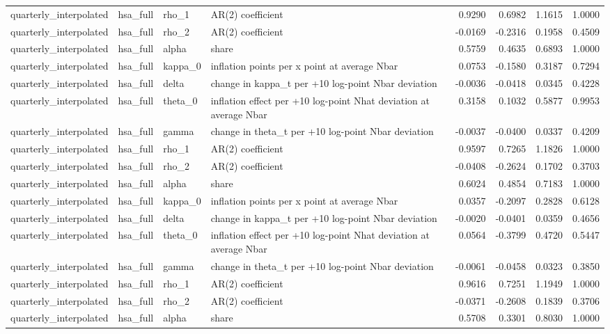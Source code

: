 \begin{tabular}{llllrrrr}
quarterly\_interpolated & hsa\_full & rho\_1 & AR(2) coefficient & 0.9290 & 0.6982 & 1.1615 & 1.0000 \\
quarterly\_interpolated & hsa\_full & rho\_2 & AR(2) coefficient & -0.0169 & -0.2316 & 0.1958 & 0.4509 \\
quarterly\_interpolated & hsa\_full & alpha & share & 0.5759 & 0.4635 & 0.6893 & 1.0000 \\
quarterly\_interpolated & hsa\_full & kappa\_0 & inflation points per x point at average Nbar & 0.0753 & -0.1580 & 0.3187 & 0.7294 \\
quarterly\_interpolated & hsa\_full & delta & change in kappa\_t per +10 log-point Nbar deviation & -0.0036 & -0.0418 & 0.0345 & 0.4228 \\
quarterly\_interpolated & hsa\_full & theta\_0 & inflation effect per +10 log-point Nhat deviation at average Nbar & 0.3158 & 0.1032 & 0.5877 & 0.9953 \\
quarterly\_interpolated & hsa\_full & gamma & change in theta\_t per +10 log-point Nbar deviation & -0.0037 & -0.0400 & 0.0337 & 0.4209 \\
quarterly\_interpolated & hsa\_full & rho\_1 & AR(2) coefficient & 0.9597 & 0.7265 & 1.1826 & 1.0000 \\
quarterly\_interpolated & hsa\_full & rho\_2 & AR(2) coefficient & -0.0408 & -0.2624 & 0.1702 & 0.3703 \\
quarterly\_interpolated & hsa\_full & alpha & share & 0.6024 & 0.4854 & 0.7183 & 1.0000 \\
quarterly\_interpolated & hsa\_full & kappa\_0 & inflation points per x point at average Nbar & 0.0357 & -0.2097 & 0.2828 & 0.6128 \\
quarterly\_interpolated & hsa\_full & delta & change in kappa\_t per +10 log-point Nbar deviation & -0.0020 & -0.0401 & 0.0359 & 0.4656 \\
quarterly\_interpolated & hsa\_full & theta\_0 & inflation effect per +10 log-point Nhat deviation at average Nbar & 0.0564 & -0.3799 & 0.4720 & 0.5447 \\
quarterly\_interpolated & hsa\_full & gamma & change in theta\_t per +10 log-point Nbar deviation & -0.0061 & -0.0458 & 0.0323 & 0.3850 \\
quarterly\_interpolated & hsa\_full & rho\_1 & AR(2) coefficient & 0.9616 & 0.7251 & 1.1949 & 1.0000 \\
quarterly\_interpolated & hsa\_full & rho\_2 & AR(2) coefficient & -0.0371 & -0.2608 & 0.1839 & 0.3706 \\
quarterly\_interpolated & hsa\_full & alpha & share & 0.5708 & 0.3301 & 0.8030 & 1.0000 \\

\end{tabular}
